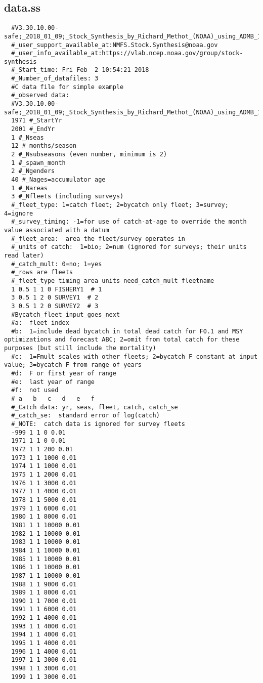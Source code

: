 \begin{landscape}
\subsection{data.ss}
\scriptsize{
\begin{verbatim}
  #V3.30.10.00-safe;_2018_01_09;_Stock_Synthesis_by_Richard_Methot_(NOAA)_using_ADMB_11.6
  #_user_support_available_at:NMFS.Stock.Synthesis@noaa.gov
  #_user_info_available_at:https://vlab.ncep.noaa.gov/group/stock-synthesis
  #_Start_time: Fri Feb  2 10:54:21 2018
  #_Number_of_datafiles: 3
  #C data file for simple example
  #_observed data: 
  #V3.30.10.00-safe;_2018_01_09;_Stock_Synthesis_by_Richard_Methot_(NOAA)_using_ADMB_11.6
  1971 #_StartYr
  2001 #_EndYr
  1 #_Nseas
  12 #_months/season
  2 #_Nsubseasons (even number, minimum is 2)
  1 #_spawn_month
  2 #_Ngenders
  40 #_Nages=accumulator age
  1 #_Nareas
  3 #_Nfleets (including surveys)
  #_fleet_type: 1=catch fleet; 2=bycatch only fleet; 3=survey; 4=ignore 
  #_survey_timing: -1=for use of catch-at-age to override the month value associated with a datum 
  #_fleet_area:  area the fleet/survey operates in 
  #_units of catch:  1=bio; 2=num (ignored for surveys; their units read later)
  #_catch_mult: 0=no; 1=yes
  #_rows are fleets
  #_fleet_type timing area units need_catch_mult fleetname
  1 0.5 1 1 0 FISHERY1  # 1
  3 0.5 1 2 0 SURVEY1  # 2
  3 0.5 1 2 0 SURVEY2  # 3
  #Bycatch_fleet_input_goes_next
  #a:  fleet index
  #b:  1=include dead bycatch in total dead catch for F0.1 and MSY optimizations and forecast ABC; 2=omit from total catch for these purposes (but still include the mortality)
  #c:  1=Fmult scales with other fleets; 2=bycatch F constant at input value; 3=bycatch F from range of years
  #d:  F or first year of range
  #e:  last year of range
  #f:  not used
  # a   b   c   d   e   f 
  #_Catch data: yr, seas, fleet, catch, catch_se
  #_catch_se:  standard error of log(catch)
  #_NOTE:  catch data is ignored for survey fleets
  -999 1 1 0 0.01
  1971 1 1 0 0.01
  1972 1 1 200 0.01
  1973 1 1 1000 0.01
  1974 1 1 1000 0.01
  1975 1 1 2000 0.01
  1976 1 1 3000 0.01
  1977 1 1 4000 0.01
  1978 1 1 5000 0.01
  1979 1 1 6000 0.01
  1980 1 1 8000 0.01
  1981 1 1 10000 0.01
  1982 1 1 10000 0.01
  1983 1 1 10000 0.01
  1984 1 1 10000 0.01
  1985 1 1 10000 0.01
  1986 1 1 10000 0.01
  1987 1 1 10000 0.01
  1988 1 1 9000 0.01
  1989 1 1 8000 0.01
  1990 1 1 7000 0.01
  1991 1 1 6000 0.01
  1992 1 1 4000 0.01
  1993 1 1 4000 0.01
  1994 1 1 4000 0.01
  1995 1 1 4000 0.01
  1996 1 1 4000 0.01
  1997 1 1 3000 0.01
  1998 1 1 3000 0.01
  1999 1 1 3000 0.01

\end{verbatim}}
\end{landscape}
